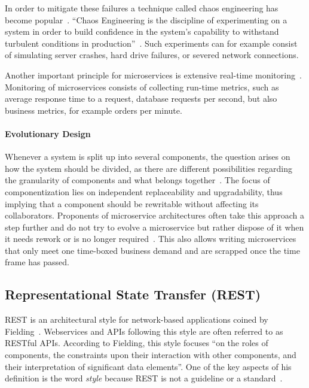 In order to mitigate these failures a technique called chaos engineering has become popular~\cite{CEC2018}.
``Chaos Engineering is the discipline of experimenting on a system in order to build confidence in the system's capability to withstand turbulent conditions in production''~\cite{CEC2018}.
Such experiments can for example consist of simulating server crashes, hard drive failures, or severed network connections.

Another important principle for microservices is extensive real-time monitoring~\cite{Lewis2014}.
Monitoring of microservices consists of collecting run-time metrics, such as average response time to a request, database requests per second, but also business metrics, for example orders per minute.

\paragraph{Evolutionary Design}

Whenever a system is split up into several components, the question arises on how the system should be divided, as there are different possibilities regarding the granularity of components and what belongs together~\cite{Lewis2014}.
The focus of componentization lies on independent replaceability and upgradability, thus implying that a component should be rewritable without affecting its collaborators.
Proponents of microservice architectures often take this approach a step further and do not try to evolve a microservice but rather dispose of it when it needs rework or is no longer required~\cite{Fowler2016,Lewis2014}.
This also allows writing microservices that only meet one time-boxed business demand and are scrapped once the time frame has passed.

\subsection{Representational State Transfer (\acs{REST})}\label{sec:rest}

\ac{REST} is an architectural style for network-based applications coined by Fielding~\cite{Fielding2000}.
Webservices and \acp{API} following this style are often referred to as \acs{REST}ful \acp{API}.
According to Fielding, this style focuses ``on the roles of components, the constraints upon their interaction with other components, and their interpretation of significant data elements''.
One of the key aspects of his definition is the word \textit{style} because \ac{REST} is not a guideline or a standard~\cite{Malakhov2018}.

